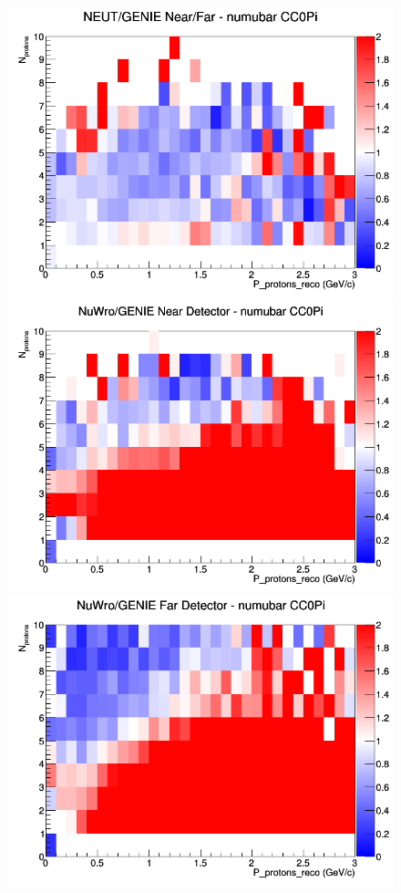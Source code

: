\begin{figure}[h]
\endminipage
{}
\includegraphics[width=\linewidth]{eff_N_P/FGT/protons/ratios/CC0Pi_NEUT_GENIE_numubar_NF_N_P.png}
\endminipage
\newline
{}
\includegraphics[width=\linewidth]{eff_N_P/FGT/protons/ratios/CC0Pi_NuWro_GENIE_numubar_near_N_P.png}
\endminipage
{}
\includegraphics[width=\linewidth]{eff_N_P/FGT/protons/ratios/CC0Pi_NuWro_GENIE_numubar_far_N_P.png}

\end{figure}
